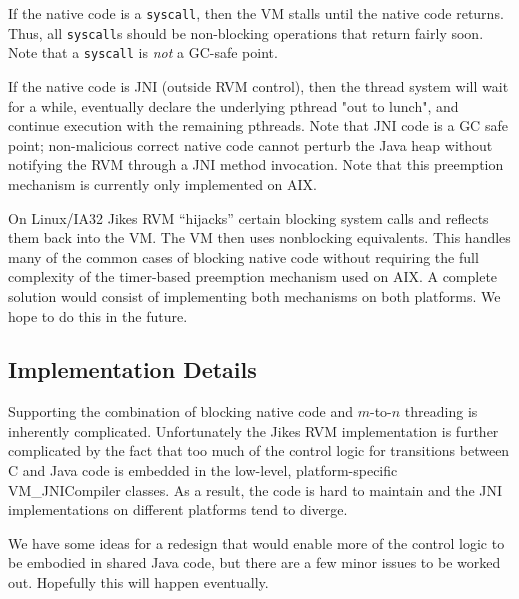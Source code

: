 If the native code is a {\tt syscall}, then the VM stalls until the native
code returns.  Thus, all {\tt syscall}s should be non-blocking
operations that return fairly soon.  Note that a {\tt syscall} is 
{\em not} a GC-safe point.

If the native code is JNI (outside RVM control), then the thread system
will wait for a while, eventually declare the underlying pthread "out to
lunch", and continue execution with the remaining pthreads.  Note that 
JNI code is a GC safe point; non-malicious correct native code cannot
perturb the Java heap without notifying the RVM through a JNI method
invocation.  Note that this preemption mechanism is currently only
implemented on AIX.

On Linux/IA32 Jikes RVM ``hijacks'' certain blocking system calls and
reflects them back into the VM. The VM then uses nonblocking
equivalents. This handles many of the common cases of blocking native
code without requiring the full complexity of the timer-based
preemption mechanism used on AIX. A complete solution would consist of
implementing both mechanisms on both platforms.  We hope to do this in
the future.

\subsection{Implementation Details}
Supporting the combination of blocking native code and $m$-to-$n$
threading is inherently complicated.  Unfortunately the Jikes RVM
implementation is further complicated by the fact that too much of the
control logic for transitions between C and Java code is embedded in
the low-level, platform-specific {VM\_JNICompiler} classes.  As a
result, the code is hard to maintain and the JNI implementations
on different platforms tend to diverge. 

We have some ideas for a redesign that would enable more of the
control logic to be embodied in shared Java code, but there are a few
minor issues to be worked out.  Hopefully this will happen eventually.
